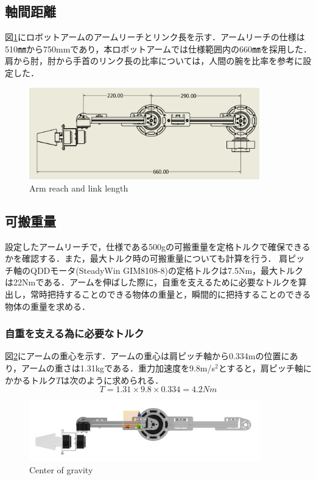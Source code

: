 \subsection{軸間距離}
図\ref{fig:link_length}にロボットアームのアームリーチとリンク長を示す．アームリーチの仕様は510㎜から750mmであり，本ロボットアームでは仕様範囲内の660㎜を採用した．肩から肘，肘から手首のリンク長の比率については，人間の腕を比率を参考に設定した\cite{humanarm:online}．
\begin{figure}
  \centering
  \includegraphics[width=10cm]{images/design/link_length.png}
  \caption{Arm reach and link length}
  \label{fig:link_length}
\end{figure}
\clearpage

\subsection{可搬重量}
設定したアームリーチで，仕様である500gの可搬重量を定格トルクで確保できるかを確認する．また，最大トルク時の可搬重量についても計算を行う．
肩ピッチ軸のQDDモータ(SteadyWin GIM8108-8)の定格トルクは7.5Nm，最大トルクは22Nmである．アームを伸ばした際に，自重を支えるために必要なトルクを算出し，常時把持することのできる物体の重量と，瞬間的に把持することのできる物体の重量を求める．
\subsubsection{自重を支える為に必要なトルク}
図\ref{fig:CoG}にアームの重心を示す．アームの重心は肩ピッチ軸から0.334mの位置にあり，アームの重さは1.31kgである．重力加速度を9.8m/s$^2$とすると，肩ピッチ軸にかかるトルク$T$は次のように求められる．
\begin{equation}
  T = 1.31 \times 9.8 \times 0.334 = 4.2 Nm
\end{equation}
\begin{figure}[h]
  \centering
  \includegraphics[width=10cm]{images/design/CoG.png}
  \caption{Center of gravity}
  \label{fig:CoG}
\end{figure}


